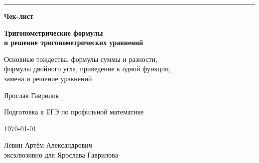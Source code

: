 \documentclass[a4paper,12pt]{article}
\begin{document}
\begin{titlepage}
\thispagestyle{empty}

\begin{center}

\vspace*{24mm}

{\color{accent}\rule{32mm}{1.2pt}}

\vspace{11mm}

{\Huge\bfseries\color{darkaccent}
Чек-лист
\par}

\vspace{7mm}

{\LARGE\bfseries
Тригонометрические формулы\\[2mm]
и решение тригонометрических уравнений
\par}

\vspace{12mm}

{\large
Основные тождества, формулы суммы и разности,\\
формулы двойного угла, приведение к одной функции,\\
замена и решение уравнений
\par}

\vfill

{\large
Ярослав Гаврилов
\par}

\vspace{7mm}

{\normalsize
Подготовка к ЕГЭ по профильной математике
\par}

\vspace{12mm}

{\normalsize
\today
\par}

\vspace{18mm}

{\small
Лёвин Артём Александрович\\
эксклюзивно для Ярослава Гаврилова
\par}

\vspace{21mm}

\end{center}


\end{titlepage}
\end{document}
